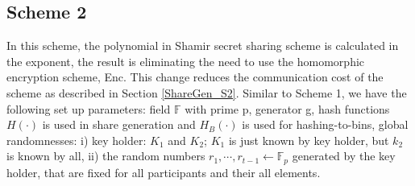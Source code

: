 \subsection{Scheme 2}
In this scheme, the polynomial in Shamir secret sharing scheme is calculated in the exponent, the result is eliminating the need to use the homomorphic encryption scheme, Enc. This change reduces the communication cost of the scheme as described in Section \ref{ShareGen_S2}. Similar to Scheme 1, we have the following set up parameters: field $\mathbb{F}$ with prime p, generator g, hash functions $H(\cdot)$ is used in share generation and $H_B(\cdot)$ is used for hashing-to-bins, global randomnesses: i) key holder: $K_1$ and $K_2$; $K_1$ is just known by key holder, but $k_2$ is known by all, ii) the random numbers $r_1, \cdots, r_{t-1} \gets \mathbb{F}_p$ generated by the key holder, that are fixed for all participants and their all elements. 

